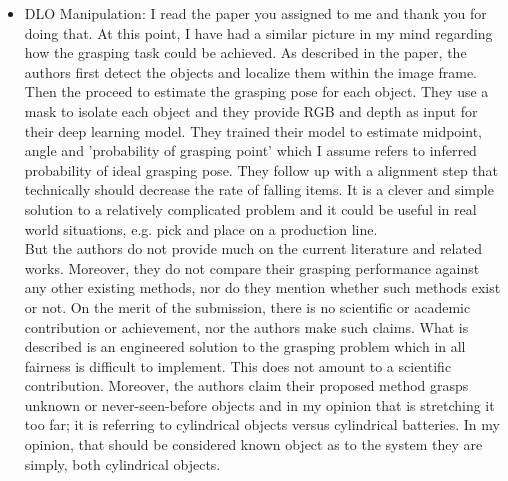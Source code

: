 \documentclass[11pt]{article}
\begin{document}
\begin{itemize}
    \item DLO Manipulation: I read the paper you assigned to me and thank you
    for doing that. At this point, I have had a similar picture in my mind
    regarding how the grasping task could be achieved. As described in the
    paper, the authors first detect the objects and localize them within the
    image frame. Then the proceed to estimate the grasping pose for each object.
    They use a mask to isolate each object and they provide RGB and depth as
    input for their deep learning model. They trained their model to estimate
    midpoint, angle and 'probability of grasping point' which I assume refers
    to inferred probability of ideal grasping pose. They follow up with a
    alignment step that technically should decrease the rate of falling items.
    It is a clever and simple solution to a relatively complicated problem and
    it could be useful in real world situations, e.g. pick and place on a
    production line. \\
    But the authors do not provide much on the current literature and related works.
    Moreover, they do not compare their grasping performance against any other
    existing methods, nor do they mention whether such methods exist or
    not. On the merit of the submission, there is no scientific or academic
    contribution or achievement, nor the authors make such claims. What is
    described is an engineered solution to the grasping problem which in all
    fairness is difficult to implement. This does not amount to a scientific
    contribution. Moreover, the authors claim their proposed method grasps
    unknown or never-seen-before objects and in my opinion that is stretching it
    too far; it is referring to cylindrical objects versus cylindrical batteries.
    In my opinion, that should be considered known object as to the system they
    are simply, both cylindrical objects.


\end{itemize}
\end{document}
